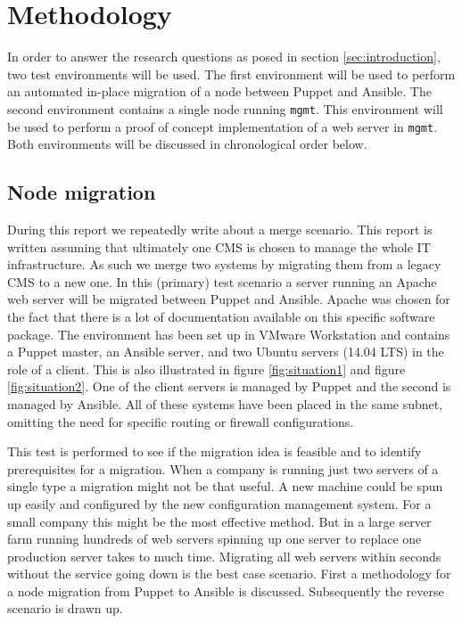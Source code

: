 \section{Methodology}\label{sec:methodology}
In order to answer the research questions as posed in section \ref{sec:introduction}, two test environments will be used. The first environment will be used to perform an automated in-place migration of a node between Puppet and Ansible. The second environment contains a single node running \texttt{mgmt}. This environment will be used to perform a proof of concept implementation of a web server in \texttt{mgmt}. Both environments will be discussed in chronological order below. 

\subsection{Node migration}
During this report we repeatedly write about a merge scenario. This report is written assuming that ultimately one CMS is chosen to manage the whole IT infrastructure. As such we merge two systems by migrating them from a legacy CMS to a new one. In this (primary) test scenario a server running an Apache web server will be migrated between Puppet and Ansible. Apache was chosen for the fact that there is a lot of documentation available on this specific software package. The environment has been set up in VMware Workstation and contains a Puppet master, an Ansible server, and two Ubuntu servers (14.04 LTS) in the role of a client. This is also illustrated in figure \ref{fig:situation1} and figure \ref{fig:situation2}. One of the client servers is managed by Puppet and the second is managed by Ansible. All of these systems have been placed in the same subnet, omitting the need for specific routing or firewall configurations. 

This test is performed to see if the migration idea is feasible and to identify prerequisites for a migration. When a company is running just two servers of a single type a migration might not be that useful. A new machine could be spun up easily and configured by the new configuration management system. For a small company this might be the most effective method. But in a large server farm running hundreds of web servers spinning up one server to replace one production server takes to much time. Migrating all web servers within seconds without the service going down is the best case scenario. First a methodology for a node migration from Puppet to Ansible is discussed. Subsequently the reverse scenario is drawn up. 

